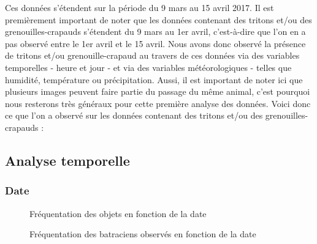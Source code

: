 \noindent Ces données s'étendent sur la période du 9 mars au 15 avril 2017. Il est premièrement important de noter que les données contenant des tritons et/ou des grenouilles-crapauds s'étendent du 9 mars au 1er avril, c'est-à-dire que l'on en a pas observé entre le 1er avril et le 15 avril. Nous avons donc observé la présence de tritons et/ou grenouille-crapaud au travers de ces données via des variables temporelles - heure et jour - et via des variables météorologiques - telles que humidité, température ou précipitation. Aussi, il est important de noter ici que plusieurs images peuvent faire partie du passage du même animal, c'est pourquoi nous resterons très généraux pour cette première analyse des données. Voici donc ce que l'on a observé sur les données contenant des tritons et/ou des grenouilles-crapauds :

\subsection{Analyse temporelle}

\subsubsection{Date}

\begin{figure}[!htb]
    \centering
    \caption{Fréquentation des objets en fonction de la date}
    \label{fig:Fréquentation des objets en fonction de la date}
\end{figure}

\begin{figure}[!htb]
    \centering
    \caption{Fréquentation des batraciens observés en fonction de la date}
    \label{fig:Fréquentation des crapauducs en fonction de la date}
\end{figure}

